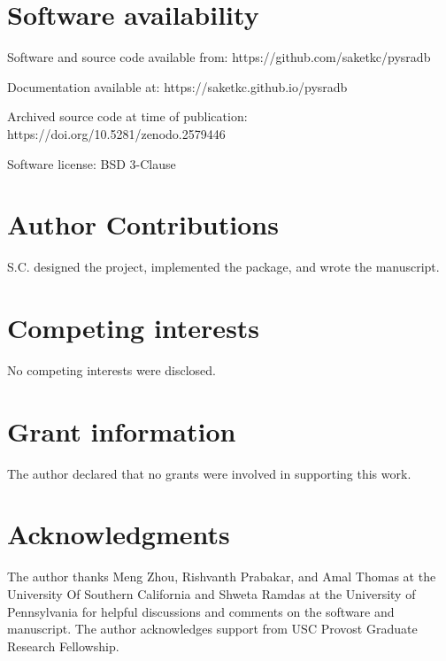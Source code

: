 \documentclass[9pt,a4paper]{extarticle}
\begin{document}
\section*{Software availability}
Software and source code available from: https://github.com/saketkc/pysradb

Documentation available at: https://saketkc.github.io/pysradb

Archived source code at time of publication: https://doi.org/10.5281/zenodo.2579446

Software license: BSD 3-Clause

\section*{Author Contributions}
S.C. designed the project, implemented the package, and wrote the manuscript.

\section*{Competing interests}
No competing interests were disclosed.

\section*{Grant information}
The author declared that no grants were involved in supporting this work.

\section*{Acknowledgments}
The author thanks Meng Zhou, Rishvanth Prabakar, and Amal Thomas at the University Of Southern California
and Shweta Ramdas at the University of Pennsylvania for helpful discussions and comments
on the software and manuscript. The author acknowledges support from USC Provost Graduate Research Fellowship. 

\begin{comment}
This section should acknowledge anyone who contributed to the research or the
article but who does not qualify as an author based on the criteria provided earlier
(e.g. someone or an organization that provided writing assistance). Please state how
they contributed; authors should obtain permission to acknowledge from all those
mentioned in the Acknowledgments section.

Please do not list grant funding in this section.
\end{comment}
\end{document}
